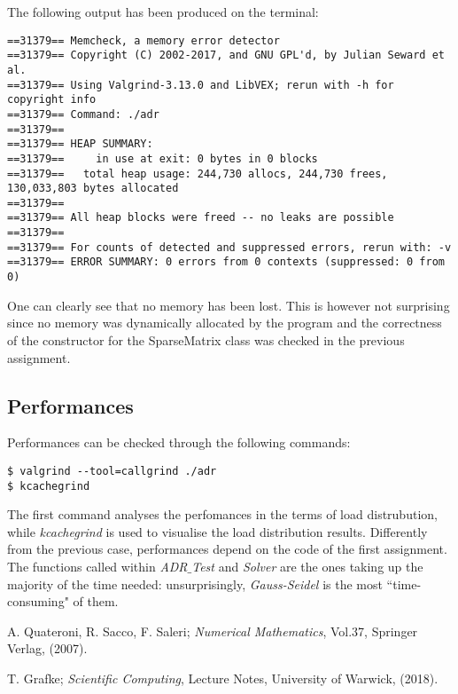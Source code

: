 \documentclass[11pt]{article}
\theoremstyle{theorem}
\theoremstyle{definition}
\begin{document}
The following output has been produced on the terminal:

\begin{verbatim}
==31379== Memcheck, a memory error detector
==31379== Copyright (C) 2002-2017, and GNU GPL'd, by Julian Seward et al.
==31379== Using Valgrind-3.13.0 and LibVEX; rerun with -h for copyright info
==31379== Command: ./adr
==31379==
==31379== HEAP SUMMARY:
==31379==     in use at exit: 0 bytes in 0 blocks
==31379==   total heap usage: 244,730 allocs, 244,730 frees, 130,033,803 bytes allocated
==31379==
==31379== All heap blocks were freed -- no leaks are possible
==31379==
==31379== For counts of detected and suppressed errors, rerun with: -v
==31379== ERROR SUMMARY: 0 errors from 0 contexts (suppressed: 0 from 0)
\end{verbatim}

One can clearly see that no memory has been lost. This is however not surprising since no memory was dynamically allocated by the program and the correctness of the constructor for the SparseMatrix class was checked in the previous assignment.\\

\subsection{Performances}
\label{subsec:perf}
Performances can be checked through the following commands:
\begin{verbatim}
$ valgrind --tool=callgrind ./adr
$ kcachegrind
\end{verbatim}

The first command analyses the perfomances in the terms of load distrubution, while \emph{kcachegrind} is used to visualise the load distribution results. Differently from the previous case, performances depend on the code of the first assignment. The functions called within \emph{ADR$\_$Test} and \emph{Solver} are the ones taking up the majority of the time needed: unsurprisingly, \emph{Gauss-Seidel} is the most ``time-consuming" of them.\\


\cleardoublepage
\begin{thebibliography}{99}

 A. Quateroni, R. Sacco, F. Saleri;
\emph{Numerical Mathematics}, Vol.37, Springer Verlag, (2007).

 T. Grafke;
\emph{Scientific Computing}, Lecture Notes, University of Warwick, (2018).







\printindex
\end{thebibliography}
\end{document}
